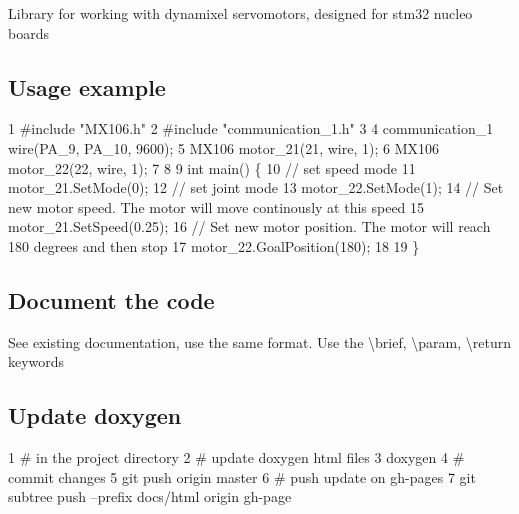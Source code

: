 Library for working with dynamixel servomotors, designed for stm32 nucleo boards

\subsection*{Usage example}


\begin{DoxyCode}
1 #include "MX106.h"
2 #include "communication\_1.h"
3 
4 communication\_1 wire(PA\_9, PA\_10, 9600);
5 MX106 motor\_21(21, wire, 1);
6 MX106 motor\_22(22, wire, 1);
7 
8 
9 int main() \{
10    // set speed mode
11    motor\_21.SetMode(0);
12    // set joint mode
13    motor\_22.SetMode(1);
14    // Set new motor speed. The motor will move continously at this speed
15    motor\_21.SetSpeed(0.25);
16    // Set new motor position. The motor will reach 180 degrees and then stop
17    motor\_22.GoalPosition(180);
18 
19 \}
\end{DoxyCode}


\subsection*{Document the code}

See existing documentation, use the same format. Use the \textbackslash{}brief, \textbackslash{}param, \textbackslash{}return keywords

\subsection*{Update doxygen}


\begin{DoxyCode}
1 # in the project directory
2 # update doxygen html files
3 doxygen
4 # commit changes
5 git push origin master
6 # push update on gh-pages
7 git subtree push --prefix docs/html origin gh-page
\end{DoxyCode}
 